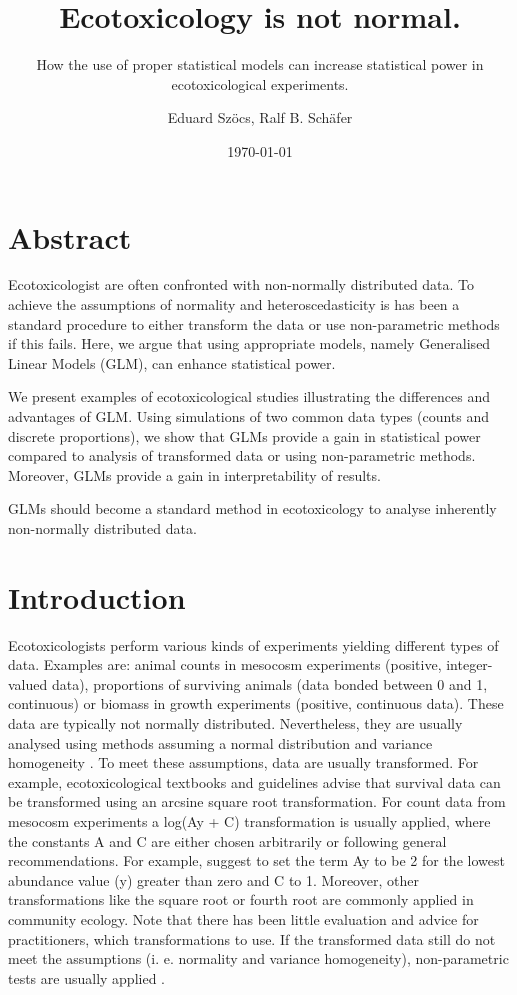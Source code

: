 \documentclass{scrartcl}
\title{Ecotoxicology is not normal.}
\subtitle{How the use of proper statistical models can increase statistical power in ecotoxicological experiments.}
\author{Eduard Szöcs, Ralf B. Schäfer}
\date{\today}
\begin{document}
\maketitle

\section*{Abstract}
Ecotoxicologist are often confronted with non-normally distributed data.
To achieve the assumptions of normality and heteroscedasticity is has been a standard procedure to either transform the data or use non-parametric methods if this fails.
Here, we argue that using appropriate models, namely Generalised Linear Models (GLM), can enhance statistical power.

We present examples of ecotoxicological studies illustrating the differences and advantages of GLM.
Using simulations of two common data types (counts and discrete proportions), we show that GLMs provide a gain in statistical power compared to analysis of transformed data or using non-parametric methods.
Moreover, GLMs provide a gain in interpretability of results.

GLMs should become a standard method in ecotoxicology to analyse inherently non-normally distributed data.




\section{Introduction}
\label{sec:intro}
Ecotoxicologists perform various kinds of experiments yielding different types of data.
Examples are: animal counts in mesocosm experiments (positive, integer-valued data), proportions of surviving animals (data bonded between 0 and 1, continuous) or biomass in growth experiments (positive, continuous data).
These data are typically not normally distributed. 
Nevertheless, they are usually analysed using methods assuming a normal distribution and variance homogeneity \citep{wang_making_2011}. 
To meet these assumptions, data are usually transformed.
For example, ecotoxicological textbooks \citep{newman_quantitative_2012} and guidelines \citep{epa_methods_2002,oecd_current_2006} advise that survival data can be transformed using an arcsine square root transformation. 
For count data from mesocosm experiments a log(Ay + C) transformation is usually applied, where the constants A and C are either chosen arbitrarily or following general recommendations. 
For example, \citet{van_den_brink_impact_2000} suggest to set the term Ay to be 2 for the lowest abundance value (y) greater than zero and C to 1. 
Moreover, other transformations like the square root or fourth root are commonly applied in community ecology.
Note that there has been little evaluation and advice for practitioners, which transformations to use.
If the transformed data still do not meet the assumptions (i. e. normality and variance homogeneity), non-parametric tests are usually applied \citep{wang_making_2011}.
\end{document}
